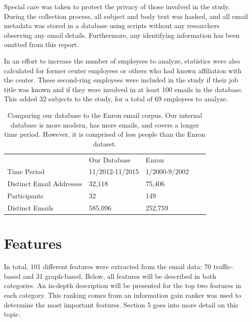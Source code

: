 \documentclass{article}
\begin{document}
Special care was taken to protect the privacy of those involved in the study.  During the collection process, all subject and body text was hashed, and all email  metadata was stored in a database using scripts without any researchers observing any email details. Furthermore, any identifying information has been omitted from this report.
\par
In an effort to increase the number of employees to analyze, statistics were also calculated for former center employees or others who had known affiliation with the center.  These second-ring employees were included in the study if their job title was known and if they were involved in at least 100 emails in the database.  This added 32 subjects to the study, for a total of 69 employees to analyze.

\begin{table}[H]
\centering
\caption{Comparing our database to the Enron email corpus.  Our internal database is more modern, has more emails, and covers a longer time period.  However, it is comprised of less people than the Enron dataset.}
\label{tab:db_stats}
\begin{tabular}{l|l|l|ll}
\cline{2-3}
                                               & Our Database    & Enron         &  &  \\ \cline{1-3}
\multicolumn{1}{|l|}{Time Period}              & 11/2012-11/2015 & 1/2000-9/2002 &  &  \\
\multicolumn{1}{|l|}{Distinct Email Addresses} & 32,118          & 75,406        &  &  \\
\multicolumn{1}{|l|}{Participants}             & 32              & 149           &  &  \\
\multicolumn{1}{|l|}{Distinct Emails}          & 585,096         & 252,759       &  &  \\ \cline{1-3}
\end{tabular}
\end{table}

\section{Features} \label{Features}
In total, 101 different features were extracted from the email data: 70 traffic-based and 31 graph-based.  Below, all features will be described in both categories. An in-depth description will be presented for the top two features in each category.  This ranking comes from an information gain ranker was used to determine the most important features.  Section 5 goes into more detail on this topic.
\end{document}
